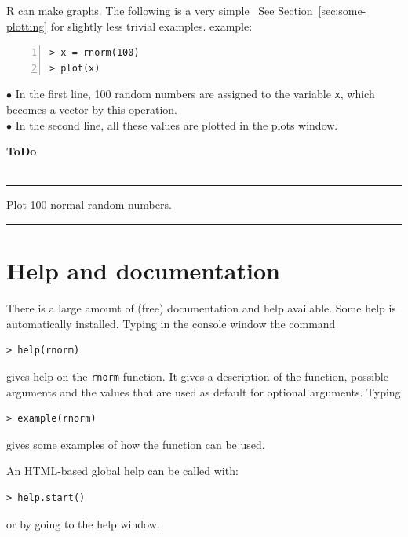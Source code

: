 \documentclass[a4paper,11pt,twocolumn,tablecaptionabove]{scrartcl} %
\makeatletter
\newenvironment{ToDo} {%
  \begin{flushright}
    \hfill
    \begin{minipage}{0.95\columnwidth}         %
    \textsf{\textbf{ToDo}} \\
      \vspace{-0.85cm}\\
      {\color{Gray}\rule[-0.1cm]{\columnwidth}{1.5pt}}} { %
      {\color{Gray} \rule[0.3cm]{\columnwidth}{1.5pt}}
    \end{minipage}
    \vspace{1em}
  \end{flushright}
  }
\let\SF@@footnote\footnote
\def\footnote{\ifx\protect\@typeset@protect
 \expandafter\SF@@footnote
 \else
 \expandafter\SF@gobble@opt
 \fi
}
\edef\SF@gobble@opt{\noexpand\protect
 \expandafter\noexpand\csname SF@gobble@opt \endcsname}
\makeatother
\begin{document}
R can make graphs. The following is a very simple~\footnote{See Section~\ref{sec:some-plotting} for slightly less trivial examples.}
example:
\begin{Verbatim}[frame=single,numbers=left,gobble=0, xleftmargin=0.35cm, numbersep=0.1cm]
> x = rnorm(100)
> plot(x)
\end{Verbatim}

\noindent $\bullet$ In the first line, 100 random numbers are assigned to the variable \texttt{x}, which becomes a vector by this operation. \\
\noindent $\bullet$ In the second line, all these
values are  plotted in the plots window.\\

\begin{ToDo}
Plot 100 normal random numbers.\\
\end{ToDo}


\section{Help and documentation}
\label{sec:help}

There is a large amount of (free) documentation and help available. 
Some help is automatically installed. Typing in the console window the command
\begin{Verbatim}[frame=single,gobble=0]
> help(rnorm)
\end{Verbatim}
gives help on the \texttt{rnorm} function. It gives a description of the function, possible arguments and the values that are used as default for optional arguments. Typing
\begin{Verbatim}[frame=single,gobble=0]
> example(rnorm)
\end{Verbatim}
gives some examples of how the function can be used. 

An HTML-based global help can be called with:
\begin{Verbatim}[frame=single,gobble=0]
> help.start()
\end{Verbatim}
or by going to the help window.
\end{document}
